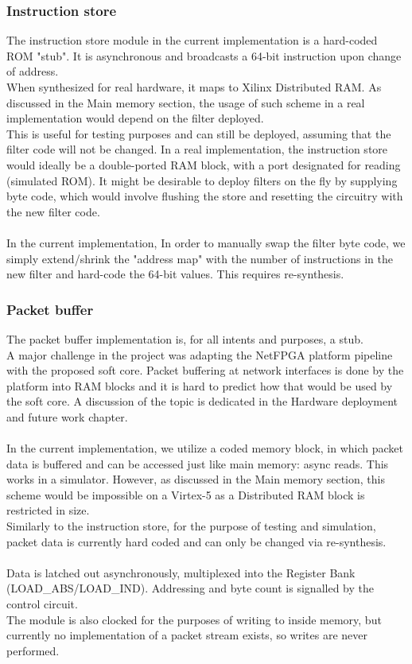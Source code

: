 \documentclass{l4proj}
\begin{document}
\subsubsection{Instruction store}
The instruction store module in the current implementation is a hard-coded ROM "stub". It is asynchronous and broadcasts a 64-bit instruction upon change of address.\\
When synthesized for real hardware, it maps to Xilinx Distributed RAM. As discussed in the Main memory section, the usage of such scheme in a real implementation would depend on the filter deployed.\\
This is useful for testing purposes and can still be deployed, assuming that the filter code will not be changed. In a real implementation, the instruction store would ideally be a double-ported RAM block, with a port designated for reading (simulated ROM). It might be desirable to deploy filters on the fly by supplying byte code, which would involve flushing the store and resetting the circuitry with the new filter code.\\\\
In the current implementation, In order to manually swap the filter byte code, we simply extend/shrink the "address map" with the number of instructions in the new filter and hard-code the 64-bit values. This requires re-synthesis.

\subsubsection{Packet buffer}
The packet buffer implementation is, for all intents and purposes, a stub.\\
A major challenge in the project was adapting the NetFPGA platform pipeline with the proposed soft core. Packet buffering at network interfaces is done by the platform into RAM blocks and it is hard to predict how that would be used by the soft core. A discussion of the topic is dedicated in the Hardware deployment and future work chapter.\\\\
In the current implementation, we utilize a coded memory block, in which packet data is buffered and can be accessed just like main memory: async reads. This works in a simulator. However, as discussed in the Main memory section, this scheme would be impossible on a Virtex-5 as a Distributed RAM block is restricted in size.\\
Similarly to the instruction store, for the purpose of testing and simulation, packet data is currently hard coded and can only be changed via re-synthesis.\\\\
Data is latched out asynchronously, multiplexed into the Register Bank (LOAD\_ABS/LOAD\_IND). Addressing and byte count is signalled by the control circuit.\\
The module is also clocked for the purposes of writing to inside memory, but currently no implementation of a packet stream exists, so writes are never performed.
\newpage
\end{document}
